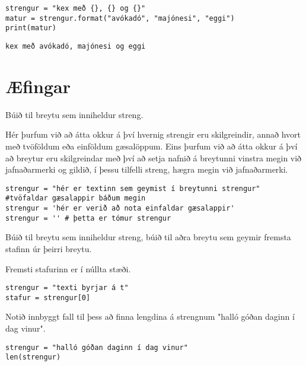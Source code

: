 \begin{lstlisting}[caption=Aðferðin .format() kynnt, label=lst:str-format]
strengur = "kex með {}, {} og {}"
matur = strengur.format("avókadó", "majónesi", "eggi")
print(matur)
\end{lstlisting}
\lstset{style=uttak}
\begin{lstlisting}
kex með avókadó, majónesi og eggi
\end{lstlisting}
\lstset{style=venjulegt}


\newpage
\section{Æfingar}
\begin{exercise}\label{str1}
	Búið til breytu sem inniheldur streng.
\end{exercise}
\begin{Answer}[ref={str1}]
	Hér þurfum við að átta okkur á því hvernig strengir eru skilgreindir, annað hvort með tvöföldum eða einföldum gæsalöppum.
	Eins þurfum við að átta okkur á því að breytur eru skilgreindar með því að setja nafnið á breytunni vinstra megin við jafnaðarmerki og gildið, í þessu tilfelli streng, hægra megin við jafnaðarmerki.
	\begin{lstlisting}
strengur = "hér er textinn sem geymist í breytunni strengur" #tvöfaldar gæsalappir báðum megin
strengur = 'hér er verið að nota einfaldar gæsalappir'
strengur = '' # þetta er tómur strengur\end{lstlisting}
\end{Answer}

\begin{exercise}\label{str2}
	Búið til breytu sem inniheldur streng, búið til aðra breytu sem geymir fremsta stafinn úr þeirri breytu.
\end{exercise}
\begin{Answer}[ref={str2}]
	Fremsti stafurinn er í núllta stæði.
	\begin{lstlisting}
strengur = "texti byrjar á t"
stafur = strengur[0]\end{lstlisting}
\end{Answer}

\begin{exercise}\label{str3}
	Notið innbyggt fall til þess að finna lengdina á strengnum "halló góðan daginn í dag vinur".
\end{exercise}
\begin{Answer}[ref={str3}]
	\begin{lstlisting}
strengur = "halló góðan daginn í dag vinur"
len(strengur)\end{lstlisting}
\end{Answer}

